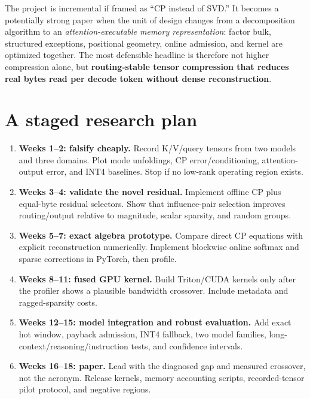 \documentclass[10pt]{article}
\begin{document}
\begin{keybox}[title={Paradigm test}]
The project is incremental if framed as ``CP instead of SVD.'' It becomes a potentially strong
paper when the unit of design changes from a decomposition algorithm to an
\emph{attention-executable memory representation}: factor bulk, structured exceptions, positional
geometry, online admission, and kernel are optimized together. The most defensible headline is
therefore not higher compression alone, but \textbf{routing-stable tensor compression that reduces
real bytes read per decode token without dense reconstruction}.
\end{keybox}

\section{A staged research plan}

\begin{enumerate}[leftmargin=1.65em,itemsep=4pt]
\item \textbf{Weeks 1--2: falsify cheaply.} Record K/V/query tensors from two models and three
domains. Plot mode unfoldings, CP error/conditioning, attention-output error, and INT4 baselines.
Stop if no low-rank operating region exists.
\item \textbf{Weeks 3--4: validate the novel residual.} Implement offline CP plus equal-byte
residual selectors. Show that influence-pair selection improves routing/output relative to
magnitude, scalar sparsity, and random groups.
\item \textbf{Weeks 5--7: exact algebra prototype.} Compare direct CP equations with explicit
reconstruction numerically. Implement blockwise online softmax and sparse corrections in PyTorch,
then profile.
\item \textbf{Weeks 8--11: fused GPU kernel.} Build Triton/CUDA kernels only after the profiler
shows a plausible bandwidth crossover. Include metadata and ragged-sparsity costs.
\item \textbf{Weeks 12--15: model integration and robust evaluation.} Add exact hot window,
payback admission, INT4 fallback, two model families, long-context/reasoning/instruction tests, and
confidence intervals.
\item \textbf{Weeks 16--18: paper.} Lead with the diagnosed gap and measured crossover, not the
acronym. Release kernels, memory accounting scripts, recorded-tensor pilot protocol, and negative
regions.
\end{enumerate}
\end{document}
